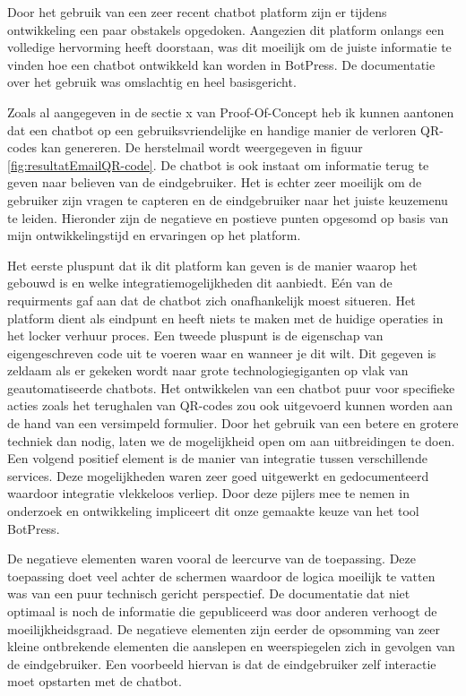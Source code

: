 Door het gebruik van een zeer recent chatbot platform zijn er tijdens ontwikkeling een paar obstakels opgedoken. Aangezien dit platform onlangs een volledige hervorming heeft doorstaan, was dit moeilijk om de juiste informatie te vinden hoe een chatbot ontwikkeld kan worden in BotPress. De documentatie over het gebruik was omslachtig en heel basisgericht. 

Zoals al aangegeven in de sectie x van Proof-Of-Concept heb ik kunnen aantonen dat een chatbot op een gebruiksvriendelijke en handige manier de verloren QR-codes kan genereren. De herstelmail wordt weergegeven in figuur \ref{fig:resultatEmailQR-code}. De chatbot is ook instaat om informatie terug te geven naar believen van de eindgebruiker. Het is echter zeer moeilijk om de gebruiker zijn vragen te capteren en de eindgebruiker naar het juiste keuzemenu te leiden. Hieronder zijn de negatieve en postieve punten opgesomd op basis van mijn ontwikkelingstijd en ervaringen op het platform.

Het eerste pluspunt dat ik dit platform kan geven is de manier waarop het gebouwd is en welke integratiemogelijkheden dit aanbiedt. Eén van de requirments gaf aan dat de chatbot zich onafhankelijk moest situeren. Het platform dient als eindpunt en heeft niets te maken met de huidige operaties in het locker verhuur proces. Een tweede pluspunt is de eigenschap van eigengeschreven code uit te voeren waar en wanneer je dit wilt. Dit gegeven is zeldaam als er gekeken wordt naar grote technologiegiganten op vlak van geautomatiseerde chatbots. 
Het ontwikkelen van een chatbot puur voor specifieke acties zoals het terughalen van QR-codes zou ook uitgevoerd kunnen worden aan de hand van een versimpeld formulier. Door het gebruik van een betere en grotere techniek dan nodig, laten we de mogelijkheid open om aan uitbreidingen te doen. Een volgend positief element is de manier van integratie tussen verschillende services. Deze mogelijkheden waren zeer goed uitgewerkt en gedocumenteerd waardoor integratie vlekkeloos verliep. Door deze pijlers mee te nemen in onderzoek en ontwikkeling impliceert dit onze gemaakte keuze van het tool BotPress.

De negatieve elementen waren vooral de leercurve van de toepassing. Deze toepassing doet veel achter de schermen waardoor de logica moeilijk te vatten was van een puur technisch gericht perspectief. De documentatie dat niet optimaal is noch de informatie die gepubliceerd was door anderen verhoogt de moeilijkheidsgraad. De negatieve elementen zijn eerder de opsomming van zeer kleine ontbrekende elementen die aanslepen en weerspiegelen zich in gevolgen van de eindgebruiker. Een voorbeeld hiervan is dat de eindgebruiker zelf interactie moet opstarten met de chatbot.


